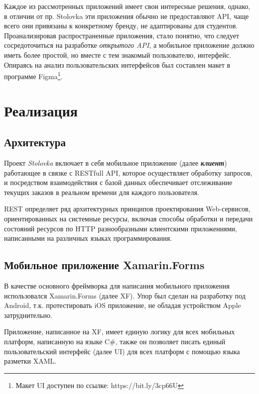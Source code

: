 \documentclass[14pt]{matmex-diploma-custom}
\begin{document}
	    Каждое из рассмотренных приложений имеет свои интересные решения, однако, в отличии от пр. Stolovka эти приложения обычно не предоставляют API, чаще всего они привязаны к конкретному бренду, не адаптированы для студентов.
	    Проанализировав распространенные приложения, стало понятно, что следует сосредоточиться на разработке {\it открытого API}, а мобильное приложение должно иметь более простой, но вместе с тем знакомый пользователю, интерфейс.
	    Опираясь на анализ пользовательских интерфейсов был составлен макет в программе Figma\footnote{Макет UI доступен по ссылке: https://bit.ly/3cp66U}.

\section{Реализация}
	\subsection{Архитектура}
	    Проект {\it Stolovka} включает в себя мобильное приложение (далее {\bf \it клиент}) работающее в связке с RESTfull API, которое осуществляет обработку запросов, и посредством взаимодействия с базой данных обеспечивает отслеживание текущих заказов в реальном времени для каждого пользователя.

	    REST определяет ряд архитектурных принципов проектирования Web-сервисов, ориентированных на системные ресурсы, включая способы обработки и передачи состояний ресурсов по HTTP разнообразными клиентскими приложениями, написанными на различных языках программирования.

	\subsection{Мобильное приложение Xamarin.Forms}
	    В качестве основного фреймворка для написания мобильного приложения использовался Xamarin.Forms (далее XF).
	    Упор был сделан на разработку под Android, т.к. протестировать iOS приложение, не обладая устройством Apple затруднительно.

	    Приложение, написанное на XF, имеет единую логику для всех мобильных платформ, написанную на языке C\#,
	    также он позволяет писать единый пользовательский интерфейс (далее UI) для всех платформ с помощью языка разметки XAML.
\end{document}
